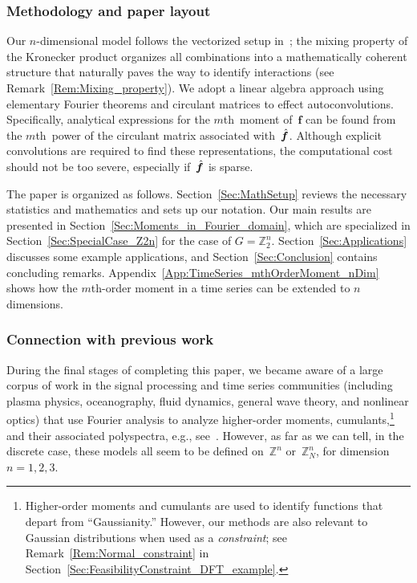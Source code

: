 \documentclass[letterpaper,11pt]{article}
\newcommand{\bs}[1]{{\boldsymbol{#1}}}
\newcommand{\Int}{\mathbb Z}
\newcommand{\hatbsf}{{\kern+0.25em}\hat{{\kern-0.25em}\bs{f}}}
\newcommand{\mth}{$m$th}
\theoremstyle{definition} \newtheorem{remark}{Remark}
\begin{document}
\subsubsection{Methodology and paper layout}
Our $n$-dimensional model follows the vectorized setup in~\cite{good1958interaction}; the mixing property of the Kronecker product organizes all combinations into a mathematically coherent structure that naturally paves the way to identify interactions (see Remark~\ref{Rem:Mixing_property}). We adopt a linear algebra approach using elementary Fourier theorems and circulant matrices to effect autoconvolutions. Specifically, analytical expressions for the \mth\ moment of~$\bs{f}$ can be found from the \mth\ power of the circulant matrix associated with~$\hatbsf$. Although explicit convolutions are required to find these representations, the computational cost should not be too severe, especially if~$\hatbsf$ is sparse.

The paper is organized as follows. Section~\ref{Sec:MathSetup} reviews the necessary statistics and mathematics and sets up our notation. Our main results are presented in Section~\ref{Sec:Moments_in_Fourier_domain}, which are specialized in Section~\ref{Sec:SpecialCase_Z2n} for the case of $G=\Int_2^n$. Section~\ref{Sec:Applications} discusses some example applications, and Section~\ref{Sec:Conclusion} contains concluding remarks. Appendix~\ref{App:TimeSeries_mthOrderMoment_nDim} shows how the \mth-order moment in a time series can be extended to $n$ dimensions.


\subsubsection{Connection with previous work}
During the final stages of completing this paper, we became aware of a large corpus of work in the signal processing and time series communities (including plasma physics, oceanography, fluid dynamics, general wave theory, and nonlinear optics) that use Fourier analysis to analyze higher-order moments, cumulants,\footnote{Higher-order moments and cumulants are used to identify functions that depart from ``Gaussianity.'' However, our methods are also relevant to Gaussian distributions when used as a \emph{constraint}; see Remark~\ref{Rem:Normal_constraint} in Section~\ref{Sec:FeasibilityConstraint_DFT_example}.} and their associated polyspectra, e.g., see~\cite{mendel1991tutorialHigherOrderStats, nikias1993higher, brillinger1983timeseriesfreqdom, priestley1988nonlinearnonstationarytimeseries, swami1997bibHOS}. However, as far as we can tell, in the discrete case, these models all seem to be defined on~$\Int^n$ or~$\Int_N^n$, for dimension $n=1,2,3$.
\end{document}

